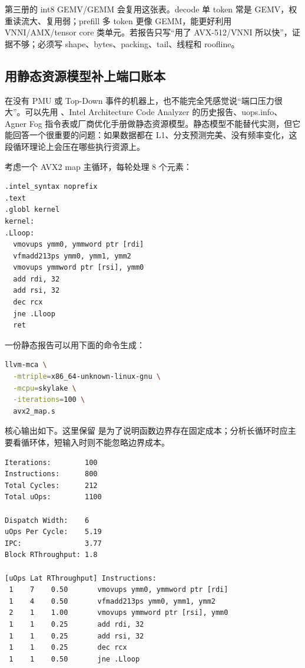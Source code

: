 第三册的 int8 GEMV/GEMM 会复用这张表。decode 单 token 常是 GEMV，权重读流大、复用弱；prefill 多 token 更像 GEMM，能更好利用 VNNI/AMX/tensor core 类单元。若报告只写“用了 AVX-512/VNNI 所以快”，证据不够；必须写 shape、bytes、packing、tail、线程和 roofline。

\subsection{用静态资源模型补上端口账本}

在没有 PMU 或 Top-Down 事件的机器上，也不能完全凭感觉说“端口压力很大”。可以先用 、Intel Architecture Code Analyzer 的历史报告、uops.info、Agner Fog 指令表或厂商优化手册做静态资源模型。静态模型不能替代实测，但它能回答一个很重要的问题：如果数据都在 L1、分支预测完美、没有频率变化，这段循环理论上会压在哪些执行资源上。

考虑一个 AVX2  map 主循环，每轮处理 8 个元素：

\begin{lstlisting}[numbers=none,caption={AVX2 map 主循环的资源建模输入}]
.intel_syntax noprefix
.text
.globl kernel
kernel:
.Lloop:
  vmovups ymm0, ymmword ptr [rdi]
  vfmadd213ps ymm0, ymm1, ymm2
  vmovups ymmword ptr [rsi], ymm0
  add rdi, 32
  add rsi, 32
  dec rcx
  jne .Lloop
  ret
\end{lstlisting}

一份静态报告可以用下面的命令生成：

\begin{lstlisting}[language=bash,numbers=none,caption={llvm-mca 静态资源建模命令}]
llvm-mca \
  -mtriple=x86_64-unknown-linux-gnu \
  -mcpu=skylake \
  -iterations=100 \
  avx2_map.s
\end{lstlisting}

核心输出如下。这里保留  是为了说明函数边界存在固定成本；分析长循环时应主要看循环体，短输入时则不能忽略边界成本。

\begin{lstlisting}[numbers=none,caption={llvm-mca 的静态吞吐和 uop 摘要}]
Iterations:        100
Instructions:      800
Total Cycles:      212
Total uOps:        1100

Dispatch Width:    6
uOps Per Cycle:    5.19
IPC:               3.77
Block RThroughput: 1.8

[uOps Lat RThroughput] Instructions:
 1    7    0.50       vmovups ymm0, ymmword ptr [rdi]
 1    4    0.50       vfmadd213ps ymm0, ymm1, ymm2
 2    1    1.00       vmovups ymmword ptr [rsi], ymm0
 1    1    0.25       add rdi, 32
 1    1    0.25       add rsi, 32
 1    1    0.25       dec rcx
 1    1    0.50       jne .Lloop
\end{lstlisting}

